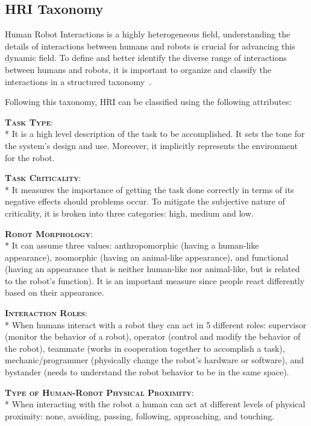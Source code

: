 \subsection{HRI Taxonomy}\label{subsec:hri_taxonomy}
Human Robot Interactions is a highly heterogeneous field, understanding the details of interactions between humans and robots is crucial for advancing this dynamic field. 
To define and better identify the diverse range of interactions between humans and robots, 
it is important to organize and classify the interactions in a structured taxonomy~\cite{yanco2004taxonomy}.

Following this taxonomy, HRI can be classified using the following attributes:

{\bfseries \scshape Task Type}:\\*
It is a high level description of the task to be accomplished. It sets the tone for the system's design and use. 
Moreover, it implicitly represents the environment for the robot.

{\bfseries \scshape Task Criticality}:\\*
It measures the importance of getting the task done correctly in terms of its negative effects should problems occur. 
To mitigate the subjective nature of criticality, it is broken into three categories: high, medium and low.

{\bfseries \scshape Robot Morphology}:\\*
It can assume three values: anthropomorphic (having a human-like appearance), zoomorphic (having an animal-like appearance), 
and functional (having an appearance that is neither human-like nor animal-like, but is related to the robot's function).
It is an important measure since people react differently based on their appearance.

{\bfseries \scshape Interaction Roles}:\\*
When humans interact with a robot they can act in 5 different roles: supervisor (monitor the behavior of a robot), 
operator (control and modify the behavior of the robot), teammate (works in cooperation together to accomplish a task), 
mechanic/programmer (physically change the robot's hardware or software), and bystander 
(needs to understand the robot behavior to be in the same space).

{\bfseries \scshape Type of Human-Robot Physical Proximity}:\\*
When interacting with the robot a human can act at different levels of physical proximity: none, avoiding, passing, 
following, approaching, and touching.

